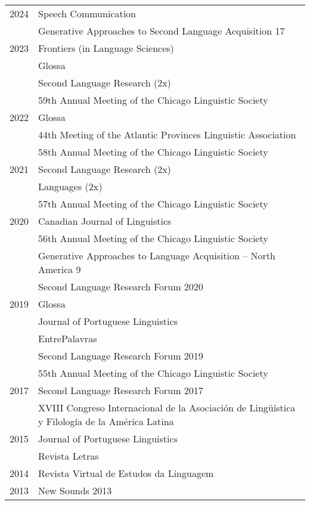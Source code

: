 \documentclass[letterpaper,10pt]{article}
\begin{document}
\begin{tabular}{p{1cm}p{16cm}}
2024	& {Speech Communication} \\
		& {Generative Approaches to Second Language Acquisition 17}\\
2023	& {Frontiers (in Language Sciences)}\\
		& {Glossa}\\
		& {Second Language Research} (2x)\\
		& {59th Annual Meeting of the Chicago Linguistic Society} \\ 			
2022	& {Glossa} \\
		& {44th Meeting of the Atlantic Provinces Linguistic Association} \\
		& {58th Annual Meeting of the Chicago Linguistic Society} \\
2021	& {Second Language Research} (2x) \\
		& {Languages} (2x) \\ 
		& {57th Annual Meeting of the Chicago Linguistic Society}\\
2020	& {Canadian Journal of Linguistics} \\
		& {56th Annual Meeting of the Chicago Linguistic Society}\\
		& {Generative Approaches to Language Acquisition -- North America 9} \\
		& {Second Language Research Forum 2020} \\
 2019	& {Glossa}  \\
        & {Journal of Portuguese Linguistics} \\
        & {EntrePalavras} \\
    	& {Second Language Research Forum 2019} \\
    	& {55th Annual Meeting of the Chicago Linguistic Society} \\
 2017   & {Second Language Research Forum 2017} \\
        & {XVIII Congreso Internacional de la Asociaci\'on de Ling\"u\'i­stica y Filolog\'i­a de la Am\'erica Latina} \\
 2015   & {Journal of Portuguese Linguistics} \\
        & {Revista Letras} \\
 2014   & {Revista Virtual de Estudos da Linguagem} \\
 2013   & {New Sounds 2013} 
  \end{tabular} 


\end{document}
